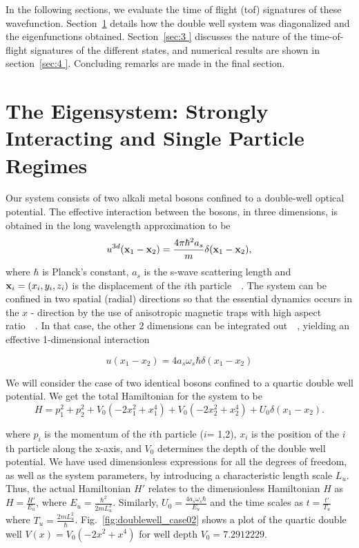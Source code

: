 \documentclass{article}
\begin{document}
In the following sections, we evaluate the time of flight (tof) signatures of these wavefunction. Section~\ref{sec:2} details how the double well system was diagonalized and the eigenfunctions obtained. Section~\ref{sec:3 } discusses the nature of the time-of-flight signatures of the different states, and numerical results are shown in section~\ref{sec:4 }. Concluding remarks are made in the final section.

\section{The Eigensystem: Strongly Interacting and Single Particle Regimes} 
\label{sec:2}
%
%
Our system consists of  two alkali metal bosons confined to a double-well optical potential.  The effective interaction between the bosons, in three dimensions, is obtained in the long wavelength approximation to be 
%
\begin{equation}
u^{3d}({\bf x}_1-{\bf x}_2)= \frac{4\pi\hbar^2 a_s}{m} \delta({\bf x}_1-{\bf x}_2),
\end{equation}
%
where ${\hbar}$ is Planck's constant, $a_s$ is the s-wave scattering length and ${\bf  x}_i = \left(  x_i,y_i,z_i \right) $ is the displacement of the $i$th particle~\cite{metcalf:vanderstraten}~\cite{pethick:bec}. The system can be confined in two spatial (radial) directions so that the essential dynamics occurs in the $x$ - direction by the use of  anisotropic magnetic traps with high aspect ratio~\cite{olshanii:1d}~\cite{petrov:1d}. In that case, the other 2 dimensions can be integrated out~\cite{mypaper}~\cite{olshanii:1d}, yielding an effective 1-dimensional interaction

\begin{equation}
u(x_1-x_2) = 4a_s \omega_s \hbar \delta(x_1-x_2)
\end{equation}
%

We will consider the case of  two identical bosons  confined to a quartic double well potential. We get the total Hamiltonian for the system to be
\begin{equation}
H =p^2_1+p^2_2+V_0 (-2 x_1^2+ x_1^4) +V_0 (-2 x_2^2+ x_2^4)+U_0 \delta(x_1-x_2) .
\label{eq:hamscale }
\end{equation}

where $p_i$ is the momentum of the $i$th particle ($i$= 1,2), $x_i$ is the position of the $i$th particle along the x-axis,  and $V_0$ determines the depth of the double well potential. We have used dimensionless expressions for all the degrees of freedom, as well as the system parameters, by introducing a characteristic length scale $L_u$. Thus, the actual Hamiltonian $H'$ relates to the dimensionless Hamiltonian $H$ as  $H=\frac{H'}{E_u}$, where $E_u=\frac{\hbar^2}{2mL^2_u}$. Similarly,  $U_0=\frac{4a_s \omega_s \hbar}{E_u}$ and the time scales as $t=\frac{t'}{T_u}$ where $T_u=\frac{2mL^2_u}{\hbar}$. Fig.~\ref{fig:doublewell_case02} shows a plot of the quartic double well $V(x)=V_0 (-2 x^2+ x^4)$ for  well depth $V_0=7.2912229$.
\end{document}
